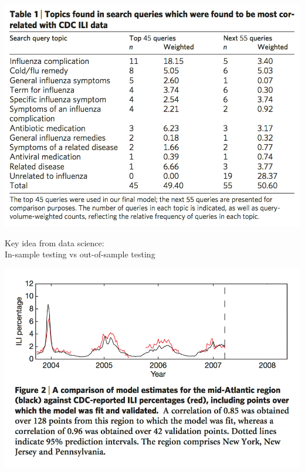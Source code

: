 \documentclass[aspectratio=169]{beamer}
\begin{document}
\begin{frame}

\begin{center}
\includegraphics[width=\textwidth]{figures/ginsberg_detecting_2009_tab1}
\end{center}

\end{frame}
\begin{frame}

Key idea from data science:\\
In-sample testing vs out-of-sample testing

\end{frame}
\begin{frame}

\begin{center}
\includegraphics[width=\textwidth]{figures/ginsberg_detecting_2009_fig2_insample}
\end{center}

\end{frame}
\end{document}
